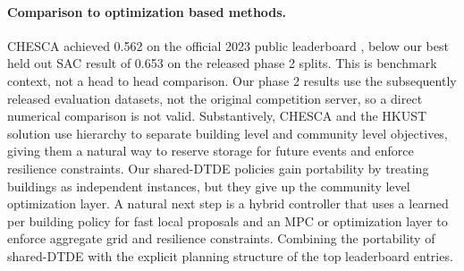 \documentclass{article}
\begin{document}
\paragraph{Comparison to optimization based methods.} CHESCA achieved 0.562 on the official 2023 public leaderboard \citep{pinto2024citylearn}, below our best held out SAC result of 0.653 on the released phase 2 splits. This is benchmark context, not a head to head comparison. Our phase 2 results use the subsequently released evaluation datasets, not the original competition server, so a direct numerical comparison is not valid. Substantively, CHESCA and the HKUST solution \citep{zheng2025optimizing} use hierarchy to separate building level and community level objectives, giving them a natural way to reserve storage for future events and enforce resilience constraints. Our shared-DTDE policies gain portability by treating buildings as independent instances, but they give up the community level optimization layer. A natural next step is a hybrid controller that uses a learned per building policy for fast local proposals and an MPC or optimization layer to enforce aggregate grid and resilience constraints. Combining the portability of shared-DTDE with the explicit planning structure of the top leaderboard entries.
\end{document}
